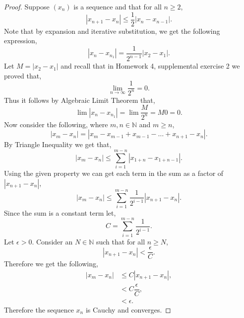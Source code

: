 \documentclass[12pt]{article}
\makeatletter
\theoremstyle{homework}
\newenvironment{exercise}[1]
{\def\@currentlabel{#1}\exercisecore}
{\endexercisecore}
\newcommand{\Nats}{\ensuremath{\mathbb N}}
\makeatother
\begin{document}
\begin{exercise}{7}
\begin{exercise}{8}
    \begin{proof}
      Suppose $(x_n)$ is a sequence and that for all $n \geq 2$,
      \begin{equation*}
        |x_{n+1} - x_n| \le \dfrac{1}{2} |x_n - x_{n-1}|.
      \end{equation*}
      Note that by expansion and iterative substitution, we get the following expression,
      \begin{equation*}
        |x_n - x_{n_1}| = \dfrac{1}{2^{n-1}}|x_2 - x_1|.
      \end{equation*}
      Let $M = |x_2 - x_1|$ and recall that in Homework 4, supplemental exercise 2 we proved that,
      \begin{equation*}
        \lim_{n \to \infty} \dfrac{1}{2^n} = 0. 
      \end{equation*}
      Thus it follows by Algebraic Limit Theorem that,
      \begin{equation*}
        \lim |x_n - x_{n_1}| = \lim \dfrac{M}{2^n} = M0 = 0.
      \end{equation*}
      Now consider the following, where $m,n \in \Nats$ and $m \geq n$,
      \begin{equation*}
        |x_m - x_n| = |x_m - x_{m-1} + x_{m-1} - \dots + x_{n+1} - x_n|.
      \end{equation*}
      By Triangle Inequality we get that,
      \begin{equation*}
        |x_m - x_n| \le \sum_{i = 1}^{m-n} |x_{1+n} - x_{1+n - 1}|.  
      \end{equation*}
      Using the given property we can get each term in the sum as a factor of $|x_{n+1} - x_n|$,
      \begin{equation*}
        |x_m - x_n| \le \sum_{i = 1}^{m-n} \dfrac{1}{2^{i-1}}|x_{n+1} - x_n|.
      \end{equation*}
      Since the sum is a constant term let,
      \begin{equation*}
        C = \sum_{i = 1}^{m-n} \dfrac{1}{2^{i-1}}.
      \end{equation*}
      Let $\epsilon > 0$. Consider an $N\in \Nats$ such that for all $n\geq N$,
      \begin{equation*}
        |x_{n+1} - x_n| < \dfrac{\epsilon}{C}. 
      \end{equation*}
      Therefore we get the following, 
      \begin{align*}
        |x_m - x_n| &\le C |x_{n+1} - x_n|,\\
        &< C \dfrac{\epsilon}{C},\\
        &< \epsilon.
      \end{align*} 
      Therefore the sequence $x_n$ is Cauchy and converges.
    \end{proof}
  \end{exercise}

\end{exercise}
\end{document}
